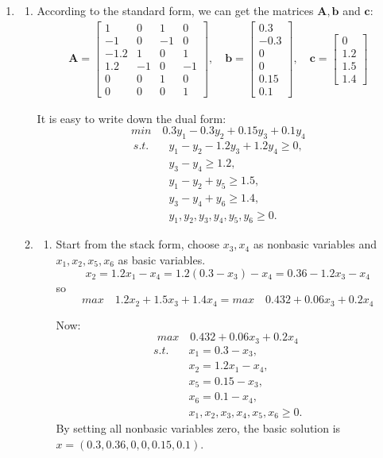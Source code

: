 \documentclass[12pt,a4paper]{article}
\makeatletter
\newtheorem*{solution}{Solution}
\theoremstyle{definition}
\renewenvironment{solution}[1][Solution] {\par\pushQED{\qed}\normalfont\topsep6\p@\@plus6\p@\relax\trivlist\item[\hskip\labelsep\bfseries#1\@addpunct{.}]\ignorespaces}{\popQED\endtrivlist\@endpefalse} \makeatother
\makeatother
\begin{document}
\begin{enumerate}
\begin{solution}
\begin{enumerate}
    \item According to the standard form, we can get the matrices $\mathbf{A},\mathbf{b}$ and $\mathbf{c}$:
    		\begin{align*}
			\mathbf{A}=\begin{bmatrix}
			1 & 0 &1 &0 \\
			-1 &0 &-1 &0\\
			-1.2 &1 &0&1\\
			1.2&-1&0&-1\\
			0&0&1&0\\
			0&0&0&1
			\end{bmatrix},\quad
			\mathbf{b}=\begin{bmatrix}
			0.3\\-0.3\\0\\0\\0.15\\0.1
			\end{bmatrix},\quad
		\mathbf{c}=\begin{bmatrix}
		0\\1.2\\1.5\\1.4
		\end{bmatrix}	
		\end{align*}
		
	It is easy to write down the dual form:
	$$min  \quad 0.3y_1-0.3y_2+0.15y_3+0.1y_4$$
	\begin{align*}
	s.t. \quad &y_1-y_2-1.2y_3+1.2y_4 \geqslant 0,\\
	&y_3 - y_4 \geqslant 1.2,\\
	&y_1 - y_2+y_5 \geqslant 1.5,\\
	&y_3 - y_4 + y_6 \geqslant 1.4,\\
	&y_1,y_2,y_3,y_4,y_5,y_6 \geqslant 0.
	\end{align*}
	
	
	\item
	\begin{enumerate}
	\item Start from the stack form, choose $x_3,x_4$ as nonbasic variables and $x_1,x_2,x_5,x_6$ as basic variables.
	$$x_2 = 1.2x_1 - x_4 = 1.2(0.3-x_3)-x_4 = 0.36 - 1.2x_3 - x_4$$
	so $$max  \quad 1.2x_2+1.5x_3+1.4x_4 = max \quad 0.432+0.06x_3+0.2x_4$$
	
	Now:
	$$max \quad 0.432+0.06x_3+0.2x_4$$
	\begin{align*}
	s.t. \quad &x_1= 0.3 - x_3,\\
	&x_2= 1.2x_1 - x_4,\\
	& x_5 = 0.15 - x_3,\\
	& x_6 = 0.1 - x_4,\\
	&x_1,x_2,x_3,x_4,x_5,x_6 \geqslant 0.
	\end{align*}
	By setting all nonbasic variables zero, the basic solution is $x = (0.3,0.36,0,0,0.15,0.1)$.
	

\end{enumerate}
\end{enumerate}
\end{solution}
\end{enumerate}
\end{document}

